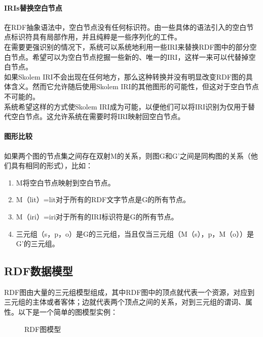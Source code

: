     \paragraph{IRIs替换空白节点}
    \indent
    在RDF抽象语法中，空白节点没有任何标识符。由一些具体的语法引入的空白节点标识符具有局部作用，并且纯粹是一些序列化的工件。\\
    在需要更强识别的情况下，系统可以系统地利用一些IRI来替换RDF图中的部分空白节点。希望可以为空白节点挖掘一些新的、唯一的IRI，这样一来可以代替掉空白节点。\\
    如果Skolem IRI不会出现在任何地方，那么这种转换并没有明显改变RDF图的具体含义。然而它允许随后使用Skolem IRI的其他图形的可能性，但这对于空白节点不可能的。\\
    系统希望这样的方式使Skolem IRI成为可能，以便他们可以将IRI识别为仅用于替代空白节点。这允许系统在需要时将IRI映射回空白节点。\\
    \paragraph{图形比较}
    \indent
    如果两个图的节点集之间存在双射M的关系，则图G和G’之间是同构图的关系（他们具有相同的形式），比如：
    \begin{enumerate}
    \item M将空白节点映射到空白节点。
    \item M（lit）=lit对于所有的RDF文字节点是G的所有节点。
    \item M（iri）=iri对于所有的IRI标识符是G的所有节点。
    \item 三元组（s，p，o）是G的三元组，当且仅当三元组（M（s），p，M（o））是G’的三元组。
    \end{enumerate}
    \subsection{RDF数据模型}
    \indent
    RDF图由大量的三元组模型组成，其中RDF图中的顶点就代表一个资源，对应到三元组的主体或者客体；边就代表两个顶点之间的关系，对到三元组的谓词、属性。以下是一个简单的图模型实例：
    \begin{figure}[htb]
    \caption{\label{1} RDF图模型}
    \end{figure}
	
